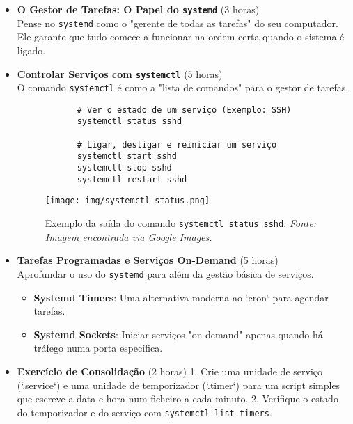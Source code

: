 \documentclass[10pt,a4paper]{article}
\begin{document}
	\begin{itemize}
		\item \textbf{O Gestor de Tarefas: O Papel do \texttt{systemd}} (3 horas) \\
		Pense no \texttt{systemd} como o "gerente de todas as tarefas" do seu computador. Ele garante que tudo comece a funcionar na ordem certa quando o sistema é ligado.
		
		\item \textbf{Controlar Serviços com \texttt{systemctl}} (5 horas) \\
		O comando \texttt{systemctl} é como a "lista de comandos" para o gestor de tarefas.
		\begin{verbatim}
			# Ver o estado de um serviço (Exemplo: SSH)
			systemctl status sshd
			
			# Ligar, desligar e reiniciar um serviço
			systemctl start sshd
			systemctl stop sshd
			systemctl restart sshd
		\end{verbatim}
		
		\begin{figure}[h]
			\centering
			\texttt{[image: img/systemctl\_status.png]}
			\caption{Exemplo da saída do comando \texttt{systemctl status sshd}. \textit{Fonte: Imagem encontrada via Google Images.}}
			\label{fig:systemctl_status}
		\end{figure}
		
		\item \textbf{Tarefas Programadas e Serviços On-Demand} (5 horas) \\
		Aprofundar o uso do \texttt{systemd} para além da gestão básica de serviços.
		\begin{itemize}
			\item \textbf{Systemd Timers}: Uma alternativa moderna ao `cron` para agendar tarefas.
			\item \textbf{Systemd Sockets}: Iniciar serviços "on-demand" apenas quando há tráfego numa porta específica.
		\end{itemize}
		
		\item \textbf{Exercício de Consolidação} (2 horas)
		1. Crie uma unidade de serviço (`.service`) e uma unidade de temporizador (`.timer`) para um script simples que escreve a data e hora num ficheiro a cada minuto.
		2. Verifique o estado do temporizador e do serviço com \texttt{systemctl list-timers}.
	\end{itemize}
	
\end{document}
